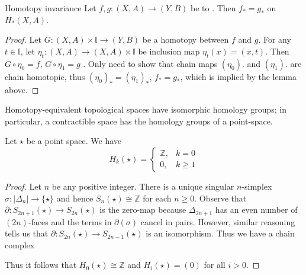 \documentclass[../main.tex]{subfiles}
\begin{document}
\begin{theorem}{Homotopy invariance}{}
Let $f, g : (X, A) \to (Y, B)$ be  to . Then $f_* = g_*$ on $H_*(X, A)$.
\end{theorem}

\begin{proof}
    Let \(  G  : \left( X,A \right)\times \mathbb{I} \to \left( Y,B \right)   \) be a homotopy between \(  f  \) and \(  g  \). For any \(  t \in \mathbb{I}  \), let \(  \eta _{t}:\left( X,A \right)\to \left( X,A \right)\times \mathbb{I}    \) be inclusion map \(  \eta _{t}\left( x \right)= \left( x,t \right)    \). Then \(  G\circ \eta _{0}= f  \), \(  G\circ \eta _{1}= g  \) . Only need to show that chain maps \(   \left( \eta _0  \right).  \) and \(  \left( \eta _1  \right).   \)  are chain homotopic, thus \(  \left( \eta _{0} \right)_{*}= \left( \eta _{1} \right)_{*}    \), \(  f_{*}= g_{*}  \), which is implied by the lemma above.  
\end{proof}

\begin{corollary}{}{}
Homotopy-equivalent topological spaces have isomorphic homology groups; in particular, a contractible space has the homology groups of a point-space.
\end{corollary}

\begin{example}{}{}
    Let \(  \star  \) be a point space. We have \[
    H_{k}\left( \star \right) = \begin{cases} \mathbb{Z} ,&k= 0\\ 
     0,&k \ge 1 \end{cases}  
    \] 
\end{example}
\begin{proof}
    Let $n$ be any positive integer. There is a unique singular $n$-simplex $\sigma : |\Delta_n| \to \{\star\}$ and hence $S_n(\star) \cong \mathbb{Z}$ for each $n \geq 0$. Observe that $\partial : S_{2n+1}(\star) \to S_{2n}(\star)$ is the zero-map because $\Delta_{2n+1}$ has an even number of $(2n)$-faces and the terms in $\partial(\sigma)$ cancel in pairs. However, similar reasoning tells us that $\partial : S_{2n}(\star) \to S_{2n-1}(\star)$ is an isomorphism. Thus we have a chain complex
\begin{center}
\end{center}
Thus it follows that $H_0(\star) \cong \mathbb{Z}$ and $H_i(\star) = (0)$ for all $i > 0$.
\end{proof}
\end{document}
